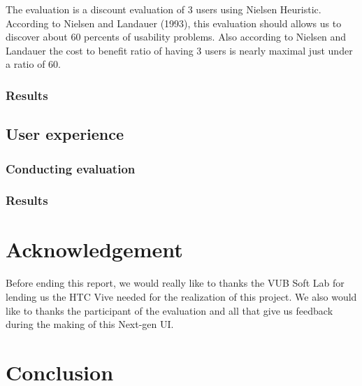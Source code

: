 \documentclass[11pt,a4paper]{article}
\begin{document}
The evaluation is a discount evaluation of 3 users using Nielsen Heuristic. According to Nielsen and Landauer (1993), this evaluation should allows us to discover about 60 percents of usability problems. Also according to Nielsen and Landauer the cost to benefit ratio of having 3 users is nearly maximal just under a ratio of 60.


\subsubsection{Results}

\subsection{User experience}


\subsubsection{Conducting evaluation}

\subsubsection{Results}



\section{Acknowledgement}

Before ending this report, we would really like to thanks the VUB Soft Lab for lending us the HTC Vive needed for the realization of this project.
We also would like to thanks the participant of the evaluation and all that give us feedback during the making of this Next-gen UI.

\section{Conclusion}
\end{document}
